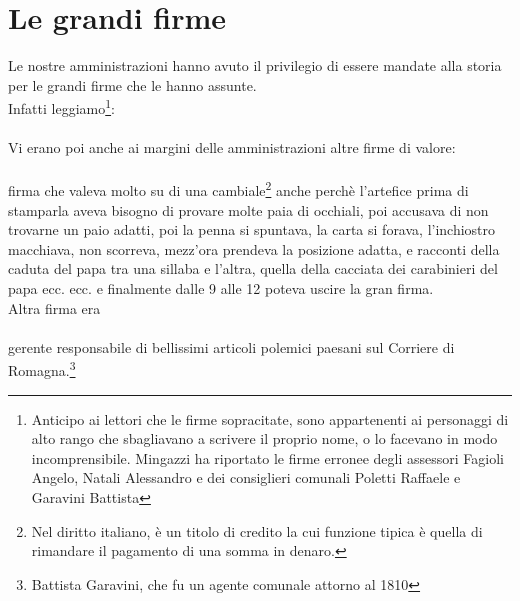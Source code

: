 \documentclass[10pt]{memoir} %
\begin{document}
\chapter{Le grandi firme}
Le nostre amministrazioni hanno avuto il privilegio di essere mandate alla storia per le grandi firme che le hanno assunte.\\
Infatti leggiamo\footnote{Anticipo ai lettori che le firme sopracitate, sono appartenenti ai personaggi di alto rango che sbagliavano a scrivere il proprio nome, o lo facevano in modo incomprensibile. Mingazzi ha riportato le firme erronee degli assessori Fagioli Angelo, Natali Alessandro e dei consiglieri comunali Poletti Raffaele e Garavini Battista}:
\\   
\normalfont
\\Vi erano poi anche ai margini delle amministrazioni altre firme di valore:
\\ \\
\normalfont
firma che valeva molto su di una cambiale\footnote{Nel diritto italiano, è un titolo di credito la cui funzione tipica è quella di rimandare il pagamento di una somma in denaro.} anche perchè l'artefice prima di stamparla aveva bisogno di provare molte paia di occhiali, poi accusava di non trovarne un paio adatti, poi la penna si spuntava, la carta si forava, l'inchiostro macchiava, non scorreva, mezz'ora prendeva la posizione adatta, e racconti della caduta del papa tra una sillaba e l'altra, quella della cacciata dei carabinieri del papa ecc. ecc. e finalmente dalle 9 alle 12 poteva uscire la gran firma. \\
Altra firma era
\\ \\ \normalfont
gerente responsabile di bellissimi articoli polemici paesani sul Corriere di Romagna.\footnote{Battista Garavini, che fu un agente comunale attorno al 1810}
\end{document}
